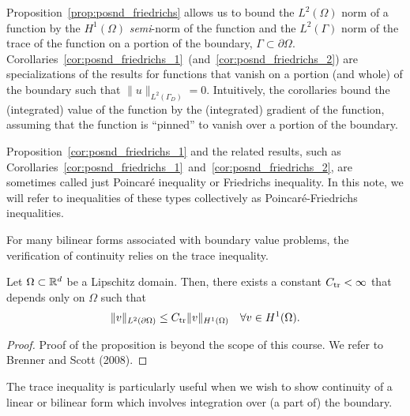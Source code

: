 Proposition~\ref{prop:posnd_friedrichs} allows us to bound the $L^2(\Omega)$ norm of a function by the $H^1(\Omega)$ \emph{semi}-norm of the function and the $L^2(\Gamma)$ norm of the trace of the function on a portion of the boundary, $\Gamma \subset \partial \Omega$.  Corollaries~\ref{cor:posnd_friedrichs_1}~(and~\ref{cor:posnd_friedrichs_2}) are specializations of the results for functions that vanish on a portion (and whole) of the boundary such that $\| u \|_{L^2(\Gamma_D)} = 0$.  Intuitively, the corollaries bound the (integrated) value of the function by the (integrated) gradient of the function, assuming that the function is ``pinned'' to vanish over a portion of the boundary.
\begin{remark}
  Proposition~\ref{cor:posnd_friedrichs_1} and the related results, such as Corollaries~\ref{cor:posnd_friedrichs_1}~and~\ref{cor:posnd_friedrichs_2}, are sometimes called just Poincar\'e inequality or Friedrichs inequality.  In this note, we will refer to inequalities of these types collectively as Poincar\'e-Friedrichs inequalities.
\end{remark}

For many bilinear forms associated with boundary value problems, the verification of continuity relies on the trace inequality.
\begin{proposition}
  \label{prop:posnd_trace_ineq}
  Let $\Omega \subset \mathbb{R}^d$ be a Lipschitz domain. Then, there exists a constant $C_{\rm tr} < \infty$ that depends only on $\Omega$ such that
  \begin{equation*}
    \| v \|_{L^2(\partial \Omega)} \leq C_{\rm tr} \| v \|_{H^1(\Omega)} \quad \forall v \in H^1(\Omega).
  \end{equation*}
    \begin{proof}
    Proof of the proposition is beyond the scope of this course.  We refer to Brenner and Scott (2008).
  \end{proof}
\end{proposition}
The trace inequality is particularly useful when we wish to show continuity of a linear or bilinear form which involves integration over (a part of) the boundary.


